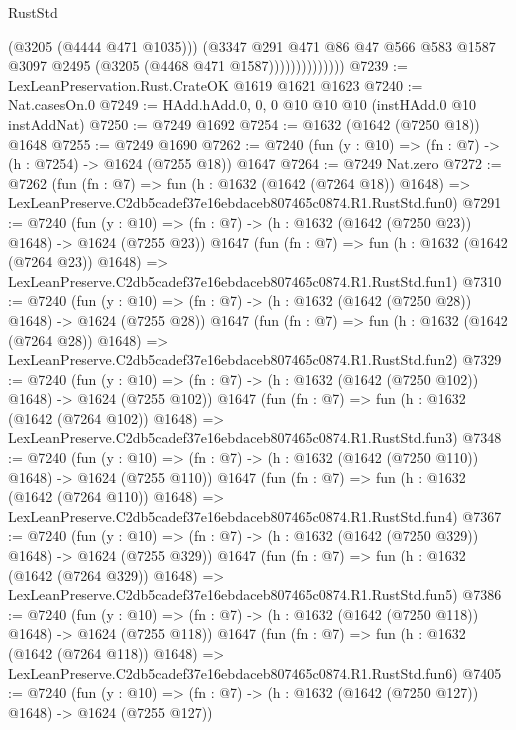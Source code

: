 \begin{lexlean}{RustStd}
\begin{coremodule}
                            (@3205 (@4444 @471 @1035)))
                          (@3347
                            @291
                            @471
                            @86
                            @47
                            @566
                            @583
                            @1587
                            @3097
                            @2495
                            (@3205 (@4468 @471 @1587))))))))))))))
@7239 := LexLeanPreservation.Rust.CrateOK @1619 @1621 @1623
@7240 := Nat.casesOn.{0}
@7249 := HAdd.hAdd.{0, 0, 0} @10 @10 @10 (instHAdd.{0} @10 instAddNat)
@7250 := @7249 @1692
@7254 := @1632 (@1642 (@7250 @18)) @1648
@7255 := @7249 @1690
@7262 := @7240 (fun (y : @10) => (fn : @7) -> (h : @7254) -> @1624 (@7255 @18)) @1647
@7264 := @7249 Nat.zero
@7272 := @7262
    (fun (fn : @7) =>
    fun (h : @1632 (@1642 (@7264 @18)) @1648) =>
    LexLeanPreserve.C2db5cadef37e16ebdaceb807465c0874.R1.RustStd.fun0)
@7291 := @7240
    (fun (y : @10) => (fn : @7) -> (h : @1632 (@1642 (@7250 @23)) @1648) -> @1624 (@7255 @23))
    @1647
    (fun (fn : @7) =>
    fun (h : @1632 (@1642 (@7264 @23)) @1648) =>
    LexLeanPreserve.C2db5cadef37e16ebdaceb807465c0874.R1.RustStd.fun1)
@7310 := @7240
    (fun (y : @10) => (fn : @7) -> (h : @1632 (@1642 (@7250 @28)) @1648) -> @1624 (@7255 @28))
    @1647
    (fun (fn : @7) =>
    fun (h : @1632 (@1642 (@7264 @28)) @1648) =>
    LexLeanPreserve.C2db5cadef37e16ebdaceb807465c0874.R1.RustStd.fun2)
@7329 := @7240
    (fun (y : @10) => (fn : @7) -> (h : @1632 (@1642 (@7250 @102)) @1648) -> @1624 (@7255 @102))
    @1647
    (fun (fn : @7) =>
    fun (h : @1632 (@1642 (@7264 @102)) @1648) =>
    LexLeanPreserve.C2db5cadef37e16ebdaceb807465c0874.R1.RustStd.fun3)
@7348 := @7240
    (fun (y : @10) => (fn : @7) -> (h : @1632 (@1642 (@7250 @110)) @1648) -> @1624 (@7255 @110))
    @1647
    (fun (fn : @7) =>
    fun (h : @1632 (@1642 (@7264 @110)) @1648) =>
    LexLeanPreserve.C2db5cadef37e16ebdaceb807465c0874.R1.RustStd.fun4)
@7367 := @7240
    (fun (y : @10) => (fn : @7) -> (h : @1632 (@1642 (@7250 @329)) @1648) -> @1624 (@7255 @329))
    @1647
    (fun (fn : @7) =>
    fun (h : @1632 (@1642 (@7264 @329)) @1648) =>
    LexLeanPreserve.C2db5cadef37e16ebdaceb807465c0874.R1.RustStd.fun5)
@7386 := @7240
    (fun (y : @10) => (fn : @7) -> (h : @1632 (@1642 (@7250 @118)) @1648) -> @1624 (@7255 @118))
    @1647
    (fun (fn : @7) =>
    fun (h : @1632 (@1642 (@7264 @118)) @1648) =>
    LexLeanPreserve.C2db5cadef37e16ebdaceb807465c0874.R1.RustStd.fun6)
@7405 := @7240
    (fun (y : @10) => (fn : @7) -> (h : @1632 (@1642 (@7250 @127)) @1648) -> @1624 (@7255 @127))

\end{coremodule}
\end{lexlean}
